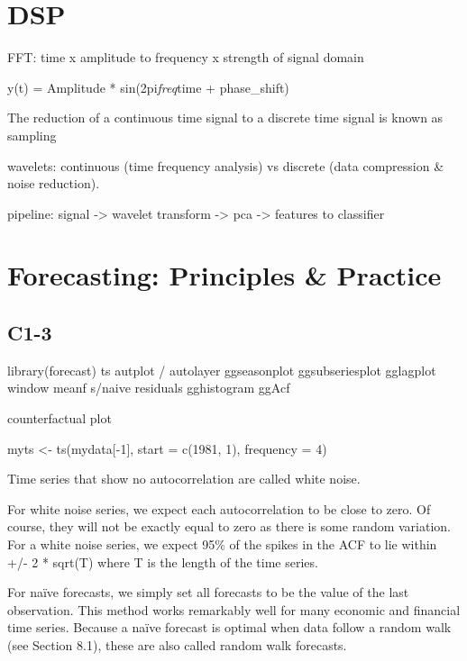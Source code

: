 \documentclass[]{book}
\begin{document}
\section{DSP}\label{dsp}

FFT: time x amplitude to frequency x strength of signal domain

y(t) = Amplitude * sin(2pi\emph{freq}time + phase\_shift)

The reduction of a continuous time signal to a discrete time signal is
known as sampling

wavelets: continuous (time frequency analysis) vs discrete (data
compression \& noise reduction).

pipeline: signal -\textgreater{} wavelet transform -\textgreater{} pca
-\textgreater{} features to classifier

\section{Forecasting: Principles \&
Practice}\label{forecasting-principles-practice}

\subsection{C1-3}\label{c1-3}

library(forecast) \textbar{} ts \textbar{} autplot / autolayer
\textbar{} ggseasonplot \textbar{} ggsubseriesplot \textbar{} gglagplot
\textbar{} window \textbar{} meanf \textbar{} s/naive \textbar{}
residuals \textbar{} gghistogram \textbar{} ggAcf \textbar{}

counterfactual plot

myts \textless{}- ts(mydata{[}-1{]}, start = c(1981, 1), frequency = 4)

Time series that show no autocorrelation are called white noise.

For white noise series, we expect each autocorrelation to be close to
zero. Of course, they will not be exactly equal to zero as there is some
random variation. For a white noise series, we expect 95\% of the spikes
in the ACF to lie within\\
+/- 2 * sqrt(T) where T is the length of the time series.

For naïve forecasts, we simply set all forecasts to be the value of the
last observation. This method works remarkably well for many economic
and financial time series. Because a naïve forecast is optimal when data
follow a random walk (see Section 8.1), these are also called random
walk forecasts.
\end{document}
